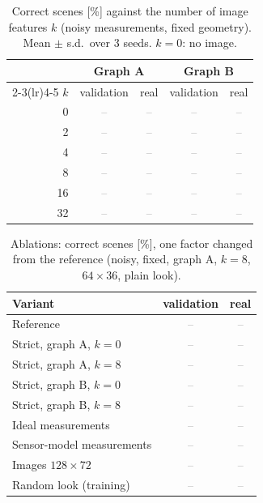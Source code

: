 \documentclass[conference]{IEEEtran}
\newcommand{\pending}{\textcolor{gray}{--}}
\begin{document}
\begin{table}[t]
\centering
\caption{Correct scenes [\%] against the number of image features $k$ (noisy measurements, fixed geometry).
Mean $\pm$ s.d.\ over 3 seeds. $k=0$: no image.}
\label{tab:sweepk}
\begin{tabular}{rcccc}
\toprule
 & \multicolumn{2}{c}{Graph A} & \multicolumn{2}{c}{Graph B} \\
\cmidrule(lr){2-3}\cmidrule(lr){4-5}
$k$ & validation & real & validation & real \\
\midrule
0  & \pending & \pending & \pending & \pending \\
2  & \pending & \pending & \pending & \pending \\
4  & \pending & \pending & \pending & \pending \\
8  & \pending & \pending & \pending & \pending \\
16 & \pending & \pending & \pending & \pending \\
32 & \pending & \pending & \pending & \pending \\
\bottomrule
\end{tabular}
\end{table}

\begin{table}[t]
\centering
\caption{Ablations: correct scenes [\%], one factor changed from the reference
(noisy, fixed, graph A, $k=8$, $64\times36$, plain look).}
\label{tab:ablation}
\begin{tabular}{lcc}
\toprule
Variant & validation & real \\
\midrule
Reference & \pending & \pending \\
Strict, graph A, $k=0$ & \pending & \pending \\
Strict, graph A, $k=8$ & \pending & \pending \\
Strict, graph B, $k=0$ & \pending & \pending \\
Strict, graph B, $k=8$ & \pending & \pending \\
Ideal measurements & \pending & \pending \\
Sensor-model measurements & \pending & \pending \\
Images $128\times72$ & \pending & \pending \\
Random look (training) & \pending & \pending \\
\bottomrule
\end{tabular}
\end{table}
\end{document}
